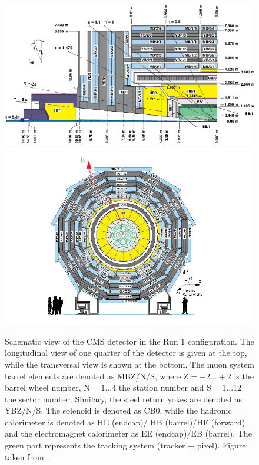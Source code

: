 \begin{figure}[htbp]
	\centering
	\includegraphics[width=1.\linewidth]{2_ExperimentalSetup/Figures/cmsview1}
	\includegraphics[width=1.\linewidth]{2_ExperimentalSetup/Figures/cmsview}
 \caption{Schematic view of the CMS detector in the Run 1 configuration. The longitudinal view of one quarter of the detector is given at the top, while the transversal view is shown at the bottom. The muon system barrel elements are denoted as MBZ/N/S, where Z$=-2...+2$ is the barrel wheel number, N$=1...4$ the station number and S$=1...12$ the sector number. Similary, the steel return yokes are denoted as YBZ/N/S. The solenoid is denoted as CB0, while the hadronic calorimeter is denoted as HE (endcap)/ HB (barrel)/HF (forward) and the electromagnet calorimeter as EE (endcap)/EB (barrel). The green part represents the tracking system (tracker + pixel). Figure taken from~\cite{Chatrchyan:1223944}.}
	\label{fig:CMSview}
\end{figure}


